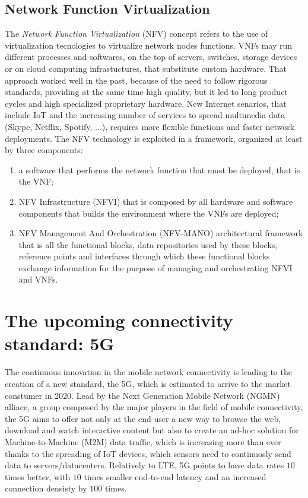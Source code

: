 \subsection{Network Function Virtualization}
The \emph{Network Function Virtualization} (NFV) concept refers to the use of 
virtualization tecnologies to virtualize network nodes functions. VNFs may run 
different processes and softwares, on the top of servers, switches, storage 
devices or on cloud computing infrastuctures, that substitute custom hardware. 
That approach worked well in the past, because of the need to follow rigorous 
standards, providing at the same time high quality, but it led to long product 
cycles and high specialized proprietary hardware. New Internet senarios, that 
include IoT and the increasing number of services to spread multimedia data 
(Skype, Netflix, Spotify, ...), requires more flexible functions and faster 
network deployments. The NFV technology is exploited in a framework, organized
at least by three components:
\begin{enumerate}
 \item a software that performs the network function that must be deployed,
 that is the VNF;
 \item NFV Infrastructure (NFVI) that is composed by all hardware and software 
components that builds the environment where the VNFs are deployed;
 \item NFV Management And Orchestration (NFV-MANO) architectural framework that
 is all the functional blocks, data repositories used by these blocks,
 reference points and interfaces through which these functional blocks exchange
 information for the purpose of managing and orchestrating NFVI and VNFs.
\end{enumerate}

\section{The upcoming connectivity standard: 5G}
The continuous innovation in the mobile network connectivity is leading to the
creation of a new standard, the 5G, which is estimated to arrive to the market
constumer in 2020. Lead by the Next Generation Mobile Network (NGMN)
alliace, a group composed by the major players in the field of mobile
connectivity, the 5G aims to offer not only at the end-user a new way to browse 
the web,
download and watch interactive content but also to create an ad-hoc solution 
for Machine-to-Machine (M2M) data traffic, which is increasing more than ever 
thanks to the spreading of IoT devices, which sensors need to continuosly send 
data to servers/datacenters. Relatively to LTE, 5G points 
to have data rates $10$ times better, with $10$ times smaller end-to-end 
latency and an increased connection densisty by $100$ times.

